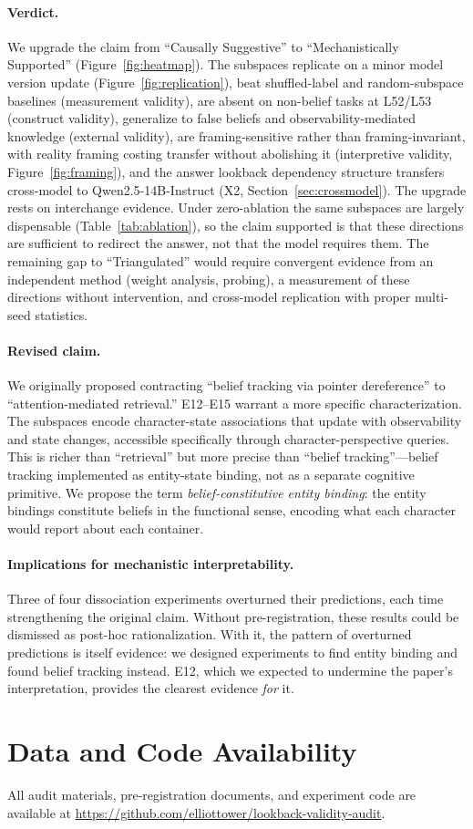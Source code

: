 \documentclass{article}
\begin{document}
\paragraph{Verdict.}
We upgrade the claim from ``Causally Suggestive'' to ``Mechanistically Supported'' (Figure~\ref{fig:heatmap}). The subspaces replicate on a minor model version update (Figure~\ref{fig:replication}), beat shuffled-label and random-subspace baselines (measurement validity), are absent on non-belief tasks at L52/L53 (construct validity), generalize to false beliefs and observability-mediated knowledge (external validity), are framing-sensitive rather than framing-invariant, with reality framing costing transfer without abolishing it (interpretive validity, Figure~\ref{fig:framing}), and the answer lookback dependency structure transfers cross-model to Qwen2.5-14B-Instruct (X2, Section~\ref{sec:crossmodel}). The upgrade rests on interchange evidence. Under zero-ablation the same subspaces are largely dispensable (Table~\ref{tab:ablation}), so the claim supported is that these directions are sufficient to redirect the answer, not that the model requires them. The remaining gap to ``Triangulated'' would require convergent evidence from an independent method (weight analysis, probing), a measurement of these directions without intervention, and cross-model replication with proper multi-seed statistics.

\paragraph{Revised claim.}
We originally proposed contracting ``belief tracking via pointer dereference'' to ``attention-mediated retrieval.'' E12--E15 warrant a more specific characterization. The subspaces encode character-state associations that update with observability and state changes, accessible specifically through character-perspective queries. This is richer than ``retrieval'' but more precise than ``belief tracking''---belief tracking implemented as entity-state binding, not as a separate cognitive primitive. We propose the term \emph{belief-constitutive entity binding}: the entity bindings constitute beliefs in the functional sense, encoding what each character would report about each container.

\paragraph{Implications for mechanistic interpretability.}
Three of four dissociation experiments overturned their predictions, each time strengthening the original claim. Without pre-registration, these results could be dismissed as post-hoc rationalization. With it, the pattern of overturned predictions is itself evidence: we designed experiments to find entity binding and found belief tracking instead. E12, which we expected to undermine the paper's interpretation, provides the clearest evidence \emph{for} it.


\section*{Data and Code Availability}

All audit materials, pre-registration documents, and experiment code are available at \url{https://github.com/elliottower/lookback-validity-audit}.



\end{document}
